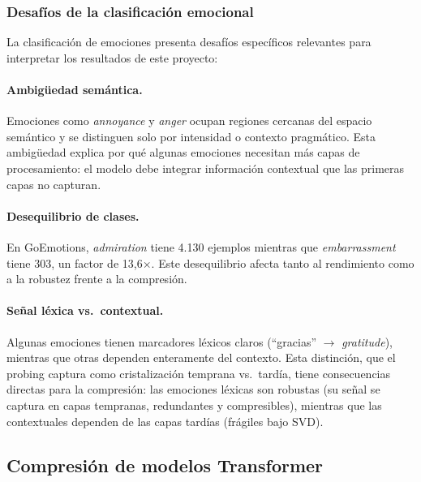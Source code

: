 \subsubsection{Desafíos de la clasificación emocional}
\label{sec:sota-desafios}

La clasificación de emociones presenta desafíos específicos relevantes para
interpretar los resultados de este proyecto:

\paragraph{Ambigüedad semántica.}
Emociones como \textit{annoyance} y \textit{anger} ocupan regiones cercanas del
espacio semántico y se distinguen solo por intensidad o contexto pragmático. Esta
ambigüedad explica por qué algunas emociones necesitan más capas de procesamiento:
el modelo debe integrar información contextual que las primeras capas no capturan.

\paragraph{Desequilibrio de clases.}
En GoEmotions, \textit{admiration} tiene 4.130 ejemplos mientras que
\textit{embarrassment} tiene 303, un factor de 13{,}6$\times$. Este
desequilibrio afecta tanto al rendimiento como a la robustez frente a la compresión.

\paragraph{Señal léxica vs.\ contextual.}
Algunas emociones tienen marcadores léxicos claros (``gracias'' $\rightarrow$
\textit{gratitude}), mientras que otras dependen enteramente del contexto. Esta
distinción, que el probing captura como cristalización temprana vs.\ tardía, tiene
consecuencias directas para la compresión: las emociones léxicas son robustas
(su señal se captura en capas tempranas, redundantes y compresibles), mientras que
las contextuales dependen de las capas tardías (frágiles bajo SVD).

\subsection{Compresión de modelos Transformer}
\label{sec:sota-compresion}

